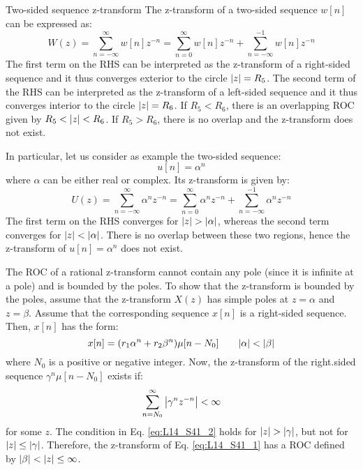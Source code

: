 \documentclass[../../main/main.tex]{subfiles}
\begin{document}
\begin{example}{Two-sided sequence z-transform}{}
    The z-transform of a two-sided sequence \( w[n] \) can be expressed as:
    \begin{equation}
        W(z)
        =
        \sum_{n=-\infty}^{\infty} w[n]z^{-n}
        =
        \sum_{n=0}^{\infty} w[n]z^{-n} + \sum_{n=-\infty}^{-1} w[n]z^{-n}
        \label{eq:L14_S36_1}
    \end{equation}
    The first term on the RHS can be interpreted as the z-transform of a right-sided sequence and it thus converges exterior to the circle \( \abs{z} = R_{5} \). The second term of the RHS can be interpreted as the z-transform of a left-sided sequence and it thus converges interior to the circle \( \abs{z} = R_{6} \).
    If \( R_{5} < R_{6} \), there is an overlapping ROC given  by \( R_{5} < \abs{z} < R_{6} \). If \( R_{5} > R_{6} \), there is no overlap and the z-transform does not exist.

    In particular, let us consider as example the two-sided sequence:
    \begin{equation}
        u[n]
        =
        \alpha^{n}
        \label{eq:L14_S38_1}
    \end{equation}
    where \( \alpha \) can be either real or complex. Its z-transform is given by:
    \begin{equation}
        U(z)
        =
        \sum_{n=-\infty}^{\infty} \alpha^{n}z^{-n}
        =
        \sum_{n=0}^{\infty} \alpha^{n}z^{-n} + \sum_{n=-\infty}^{-1} \alpha^{n}z^{-n}
        \label{eq:L14_S38_2}
    \end{equation}
    The first term on the RHS converges for \( \abs{z} > \abs{\alpha} \), whereas the second term converges for \( \abs{z} < \abs{\alpha} \). There is no overlap between these two regions, hence the z-transform of \( u[n] = \alpha^{n} \) does not exist.
\end{example}

The ROC of a rational z-transform cannot contain any pole (since it is infinite at a pole) and is bounded by the poles. To show that the z-transform is bounded by the poles, assume that the z-transform \( X(z) \) has simple poles at \( z = \alpha \) and \( z = \beta \). Assume that the corresponding sequence \( x[n] \) is a right-sided sequence.
Then, \( x[n] \) has the form:
\begin{equation}
    x[n]
    =
    \qty(r_{1}\alpha^{n} + r_{2}\beta^{n}) \mu[n-N_{0}]
    \qquad
    \abs{\alpha} < \abs{\beta}
    \label{eq:L14_S41_1}
\end{equation}
where \( N_{0} \) is a positive or negative integer. Now, the z-transform of the right.sided sequence \( \gamma^{n} \mu[n-N_{0}] \) exists if:
\begin{equation}
    \sum_{n=N_{0}}^{\infty} \abs{\gamma^{n}z^{-n}}
    <
    \infty
    \label{eq:L14_S41_2}
\end{equation}
for some \( z \). The condition in Eq. \ref{eq:L14_S41_2} holds for \( \abs{z} > \abs{\gamma} \), but not for \( \abs{z} \le \abs{\gamma} \). Therefore, the z-transform of Eq. \ref{eq:L14_S41_1} has a ROC defined by \( \abs{\beta} < \abs{z} \le \infty \).
\end{document}
